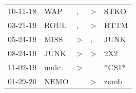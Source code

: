 \begin{supertabular}{p{0.07\textwidth}p{0.06\textwidth}p{0.02\textwidth}p{0.02\textwidth}p{0.06\textwidth}}
          10-11-18\textsuperscript{} &            WAP\textsuperscript{} &                , &     \textgreater &           STKO\textsuperscript{} \\
          03-21-19\textsuperscript{} &           ROUL\textsuperscript{} &                , &     \textgreater &           BTTM\textsuperscript{} \\
          05-24-19\textsuperscript{} &           MISS\textsuperscript{} &     \textgreater &                , &           JUNK\textsuperscript{} \\
          08-24-19\textsuperscript{} &           JUNK\textsuperscript{} &     \textgreater &     \textgreater &            2X2\textsuperscript{} \\
          11-02-19\textsuperscript{} &           mulc\textsuperscript{} &     \textgreater &                  &                            *CS1* \\
          01-29-20\textsuperscript{} &           NEMO\textsuperscript{} &                  &     \textgreater &           zomb\textsuperscript{} \\
\end{supertabular}
